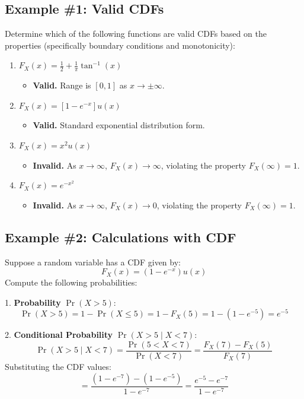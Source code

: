 \documentclass[11pt]{article}
\begin{document}
\subsection{Example \#1: Valid CDFs}
Determine which of the following functions are valid CDFs based on the properties (specifically boundary conditions and monotonicity):

\begin{enumerate}
    \item $F_{X}(x) = \frac{1}{2} + \frac{1}{\pi}\tan^{-1}(x)$
    \begin{itemize}
        \item \textbf{Valid.} Range is $[0, 1]$ as $x \to \pm \infty$.
    \end{itemize}
    
    \item $F_{X}(x) = [1 - e^{-x}]u(x)$
    \begin{itemize}
        \item \textbf{Valid.} Standard exponential distribution form.
    \end{itemize}
    
    \item $F_{X}(x) = x^2 u(x)$
    \begin{itemize}
        \item \textbf{Invalid.} As $x \to \infty$, $F_X(x) \to \infty$, violating the property $F_X(\infty)=1$.
    \end{itemize}

    \item $F_{X}(x) = e^{-x^{2}}$
    \begin{itemize}
        \item \textbf{Invalid.} As $x \to \infty$, $F_X(x) \to 0$, violating the property $F_X(\infty)=1$.
    \end{itemize}
\end{enumerate}

\subsection{Example \#2: Calculations with CDF}
Suppose a random variable has a CDF given by:
$$ F_{X}(x) = (1 - e^{-x})u(x) $$
Compute the following probabilities:

1. \textbf{Probability} $\Pr(X > 5)$:
   $$ \Pr(X > 5) = 1 - \Pr(X \le 5) = 1 - F_{X}(5) = 1 - (1 - e^{-5}) = e^{-5} $$

2. \textbf{Conditional Probability} $\Pr(X > 5 \mid X < 7)$:
   $$ \Pr(X > 5 \mid X < 7) = \frac{\Pr(5 < X < 7)}{\Pr(X < 7)} = \frac{F_X(7) - F_X(5)}{F_X(7)} $$
   Substituting the CDF values:
   $$ = \frac{(1 - e^{-7}) - (1 - e^{-5})}{1 - e^{-7}} = \frac{e^{-5} - e^{-7}}{1 - e^{-7}} $$
\end{document}
